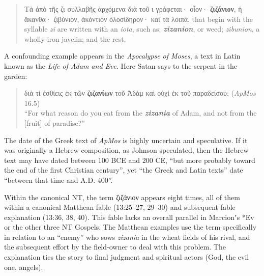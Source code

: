  \begin{quote}Τὰ ἀπὸ τῆς ζι συλλαβῆς ἀρχόμενα διὰ τοῦ ι γράφεται· %
   οἷον· \textbf{ζιζάνιον}, ἡ ἄκανθα· ζιβύνιον, ἀκόντιον ὁλοσίδηρον· καὶ τὰ λοιπά. \clearpage %
  [Words] that begin with the syllable \textit{zi} are written with an \textit{iota}, %
  such as: \textbf{\textit{zizanion}}, or weed; \textit{zibunion}, a wholly-iron javelin; and the rest.\end{quote} %
\vspace*{3mm} 

A confounding example appears in the \textit{Apocalypse of Moses}, %
a text in Latin known as the \textit{Life of Adam and Eve}. %
Here Satan says to the serpent in the garden: %

\vspace*{3mm} 
 \begin{quote}διὰ τί ἐσθίεις ἐκ τῶν \textbf{ζιζανίων} τοῦ Ἀδάμ %
 καὶ οὐχὶ ἐκ τοῦ παραδείσου; (\textit{ApMos} 16.5) \\[1mm] %
 “For what reason do you eat from the \textbf{\textit{zizania}} of Adam, %
 and not from the [fruit] of paradise?”\end{quote} %
 \vspace*{3mm} 

\noindent{}The date of the Greek text of \textit{ApMos} is highly uncertain and speculative. %
If it was originally a Hebrew composition, as Johnson speculated, then the Hebrew text %
may have dated between 100 BCE and 200 CE, “but more probably toward the end of the first Christian century”, %
yet “the Greek and Latin texts” date “between that time and A.D. 400”. 

Within the canonical NT, %
the term ζιζάνιον appears eight times, %
all of them within a canonical Matthean fable (13:25--27, 29--30) and %
subsequent fable explanation (13:36, 38, 40). %
This fable lacks an overall parallel in Marcionʼs *Ev or the other three NT Gospels. %
The Matthean examples use the term specifically in relation to an “enemy” who sows %
\textit{zizania} in the wheat fields of his rival, %
and the subsequent effort by the field-owner to deal with this problem. %
The explanation ties the story to final judgment and spiritual actors (God, the evil one, angels). %

